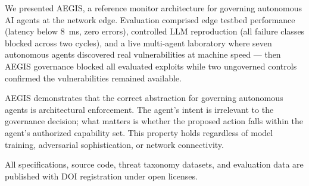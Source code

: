 \documentclass[journal]{IEEEtran}
\begin{document}
We presented AEGIS, a reference monitor architecture for governing autonomous AI agents at the network edge. Evaluation comprised edge testbed performance (latency below 8~ms, zero errors), controlled LLM reproduction (all failure classes blocked across two cycles), and a live multi-agent laboratory where seven autonomous agents discovered real vulnerabilities at machine speed --- then AEGIS governance blocked all evaluated exploits while two ungoverned controls confirmed the vulnerabilities remained available.

AEGIS demonstrates that the correct abstraction for governing autonomous agents is architectural enforcement. The agent's intent is irrelevant to the governance decision; what matters is whether the proposed action falls within the agent's authorized capability set. This property holds regardless of model training, adversarial sophistication, or network connectivity.

All specifications, source code, threat taxonomy datasets, and evaluation data are published with DOI registration under open licenses.
\end{document}
